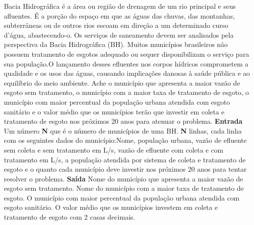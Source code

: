 \documentclass[a4paper, 12pt]{article}
\begin{document}
\vspace{5pt} 
Bacia Hidrográfica é a área ou região de drenagem de um rio principal e seus afluentes. É a porção do espaço em que as águas das chuvas, das montanhas, subterrâneas ou de outros rios escoam em direção a um determinado curso d’água, abastecendo-o. Os serviços de saneamento devem ser analisados pela perspectiva da Bacia Hidrográfica (BH).  Muitos municípios brasileiros não possuem tratamento de esgotos adequado ou sequer disponibilizam o serviço para sua população.O lançamento desses efluentes nos corpos hídricos comprometem a qualidade e os usos das águas, causando implicações danosas à saúde pública e ao equilíbrio do meio ambiente.\newline
Ache o município que apresenta a maior vazão de esgoto sem tratamento, o município com a maior taxa de tratamento de esgoto, o município com maior percentual da população urbana atendida com esgoto sanitário e o valor médio que os municípios terão que investir em coleta e tratamento de esgoto nos próximos 20 anos para atenuar o problema.
\newline \newline
\textbf{{\large Entrada}} \newline
Um número \textbf{N} que é o número de municípios de uma BH. \newline
\textbf{N} linhas, cada linha com os seguintes dados do município:\newline Nome, população urbana, vazão de efluente sem coleta e sem tratamento em L/s, vazão de efluente com coleta e com tratamento em L/s, a população atendida por sistema de coleta e tratamento de esgoto e o quanto cada município deve investir nos próximos 20 anos para tentar resolver o problema.
\newline \newline
\textbf{{\large Saída}} \newline
Nome do município que apresenta a maior vazão de esgoto sem tratamento.\newline
Nome do município com a maior taxa de tratamento de esgoto. \newline
O município com maior percentual da população urbana atendida com esgoto sanitário. \newline
O valor médio que os municípios investem em coleta e tratamento de esgoto com 2 casas decimais.
\newline \newline
\newline
\end{document}

